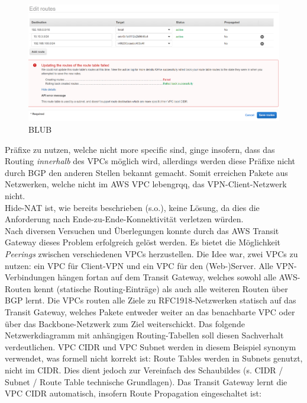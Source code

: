 \begin{figure}[h]
  \centering
  \includegraphics[scale=0.4]{Figures/more_specific_not_allowed_aws.PNG}
  \caption{BLUB}
  \label{grafik:more_specific_not_allowed_aws}
\end{figure}\FloatBarrier

Präfixe zu nutzen, welche nicht more specific sind, ginge insofern, dass das Routing \textit{innerhalb} des VPCs möglich wird, allerdings werden diese Präfixe nicht durch BGP den anderen Stellen bekannt gemacht. Somit erreichen Pakete aus Netzwerken, welche nicht im AWS VPC \glqq leben{grqq}, das VPN-Client-Netzwerk nicht.\\
Hide-NAT ist, wie bereits beschrieben (s.o.), keine Lösung, da dies die Anforderung nach Ende-zu-Ende-Konnektivität verletzen würden.\\
Nach diversen Versuchen und Überlegungen konnte durch das AWS Transit Gateway dieses Problem erfolgreich gelöst werden. Es bietet die Möglichkeit \textit{Peerings} zwischen verschiedenen VPCs herzustellen. Die Idee war, zwei VPCs zu nutzen: ein VPC für Client-VPN und ein VPC für den (Web-)Server. Alle VPN-Verbindungen hängen fortan auf dem Transit Gateway, welches sowohl alle AWS-Routen kennt (statische Routing-Einträge) als auch alle weiteren Routen über BGP lernt. Die VPCs routen alle Ziele zu RFC1918-Netzwerken statisch auf das Transit Gateway, welches Pakete entweder weiter an das benachbarte VPC oder über das Backbone-Netzwerk zum Ziel weiterschickt. Das folgende Netzwerkdiagramm mit anhängigen Routing-Tabellen soll diesen Sachverhalt verdeutlichen. VPC CIDR und VPC Subnet werden in diesem Beispiel synonym verwendet, was formell nicht korrekt ist: Route Tables werden in Subnets genutzt, nicht im CIDR. Dies dient jedoch zur Vereinfach des Schaubildes (s. CIDR / Subnet / Route Table technische Grundlagen). Das Transit Gateway lernt die VPC CIDR automatisch, insofern Route Propagation eingeschaltet ist:

